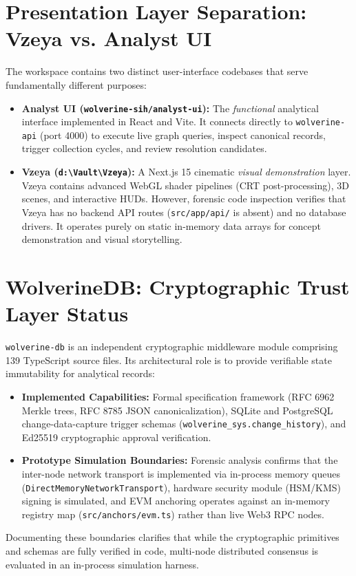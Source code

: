 \section{Presentation Layer Separation: Vzeya vs. Analyst UI}
\label{sec:arch-frontend}
The workspace contains two distinct user-interface codebases that serve fundamentally different purposes:

\begin{itemize}
    \item \textbf{Analyst UI (\texttt{wolverine-sih/analyst-ui}):} The \textit{functional} analytical interface implemented in React and Vite. It connects directly to \texttt{wolverine-api} (port 4000) to execute live graph queries, inspect canonical records, trigger collection cycles, and review resolution candidates.
    \item \textbf{Vzeya (\texttt{d:\textbackslash Vault\textbackslash Vzeya}):} A Next.js 15 cinematic \textit{visual demonstration} layer. Vzeya contains advanced WebGL shader pipelines (CRT post-processing), 3D scenes, and interactive HUDs. However, forensic code inspection verifies that Vzeya has no backend API routes (\texttt{src/app/api/} is absent) and no database drivers. It operates purely on static in-memory data arrays for concept demonstration and visual storytelling.
\end{itemize}

\section{WolverineDB: Cryptographic Trust Layer Status}
\label{sec:arch-wolverinedb}
\texttt{wolverine-db} is an independent cryptographic middleware module comprising 139 TypeScript source files. Its architectural role is to provide verifiable state immutability for analytical records:

\begin{itemize}
    \item \textbf{Implemented Capabilities:} Formal specification framework (RFC 6962 Merkle trees, RFC 8785 JSON canonicalization), SQLite and PostgreSQL change-data-capture trigger schemas (\texttt{wolverine\_sys.change\_history}), and Ed25519 cryptographic approval verification.
    \item \textbf{Prototype Simulation Boundaries:} Forensic analysis confirms that the inter-node network transport is implemented via in-process memory queues (\texttt{DirectMemoryNetworkTransport}), hardware security module (HSM/KMS) signing is simulated, and EVM anchoring operates against an in-memory registry map (\texttt{src/anchors/evm.ts}) rather than live Web3 RPC nodes.
\end{itemize}
Documenting these boundaries clarifies that while the cryptographic primitives and schemas are fully verified in code, multi-node distributed consensus is evaluated in an in-process simulation harness.
